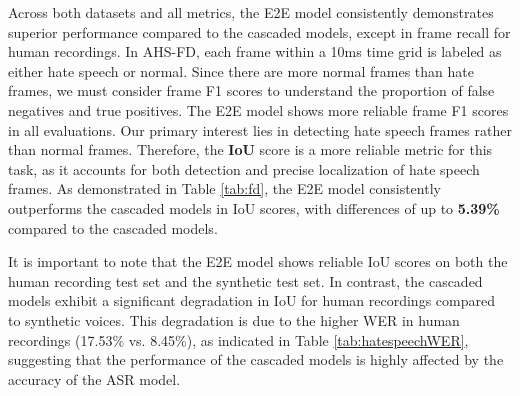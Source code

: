\documentclass[11pt]{article}
\begin{document}
Across both datasets and all metrics, the E2E model consistently demonstrates superior performance compared to the cascaded models, except in frame recall for human recordings. In AHS-FD, each frame within a 10ms time grid is labeled as either hate speech or normal. Since there are more normal frames than hate frames, we must consider frame F1 scores to understand the proportion of false negatives and true positives. The E2E model shows more reliable frame F1 scores in all evaluations.
Our primary interest lies in detecting hate speech frames rather than normal frames. Therefore, the \textbf{IoU} score is a more reliable metric for this task, as it accounts for both detection and precise localization of hate speech frames. As demonstrated in Table \ref{tab:fd}, the E2E model consistently outperforms the cascaded models in IoU scores, with differences of up to \textbf{5.39\%} compared to the cascaded models.

It is important to note that the E2E model shows reliable IoU scores on both the human recording test set and the synthetic test set. In contrast, the cascaded models exhibit a significant degradation in IoU for human recordings compared to synthetic voices. This degradation is due to the higher WER in human recordings (17.53\% vs. 8.45\%), as indicated in Table \ref{tab:hatespeechWER}, suggesting that the performance of the cascaded models is highly affected by the accuracy of the ASR model.

\begin{table}[t]
\centering
{}
\caption{Comparison between word error rate (WER) for the entire test set, and for words annotated as hate speech.}
\label{tab:hatespeechWER}
\end{table}




\end{document}
